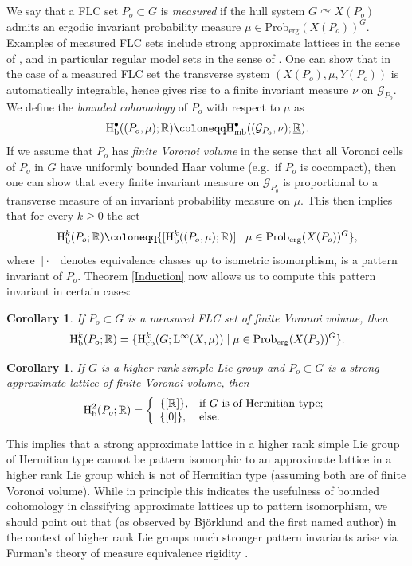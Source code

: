 \documentclass[11pt, oneside]{amsart}
\newtheorem{intro_cor}[intro_thm]{Corollary}
\theoremstyle{definition}
\theoremstyle{remark}
\theoremstyle{TheoremNum}
\newcommand{\Hb}{\textup{H}_{\textup{b}}}
\newcommand{\Hmb}{\textup{H}_{\textup{mb}}}
\newcommand{\Hcb}{\textup{H}_{\textup{cb}}}
\newcommand{\Linf}{\mathrm{L}^{\infty}}
\newcommand{\cG}{\mathcal{G}}
\newcommand{\bR}{\mathbb{R}}
\begin{document}
We say that a FLC set $P_o \subset G$ is \emph{measured} if the hull system $G \curvearrowright X(P_o)$ admits an ergodic invariant probability measure $\mu \in \mathrm{Prob}_{\mathrm{erg}}(X(P_o))^G$. Examples of measured FLC sets include strong approximate lattices in the sense of \cite{BHApproximateLattices}, and in particular regular model sets in the sense of \cite{BHP1}. One can show that in the case of a measured FLC set the transverse system $(X(P_o), \mu, Y(P_o))$ is automatically integrable, hence gives rise to a finite invariant measure $\nu$ on $\cG_{P_o}$. We define the \emph{bounded cohomology} of $P_o$ with respect to $\mu$ as
\[
\Hb^\bullet((P_o, \mu); \bR) \coloneqq \Hmb^\bullet((\cG_{P_o}, \nu); \underline{\bR}).
\]
If we assume that $P_o$ has \emph{finite Voronoi volume} in the sense that all Voronoi cells of $P_o$ in $G$ have uniformly bounded Haar volume (e.g.\ if $P_o$ is cocompact), then one can show that every finite invariant measure on $\cG_{P_o}$ is proportional to a transverse measure of an invariant probability measure on $\mu$. This then implies that for every $k \geq 0$ the set 
\[
\Hb^k(P_o; \bR) \coloneqq \{[\Hb^k((P_o, \mu); \bR)] \mid \mu \in \mathrm{Prob}_{\mathrm{erg}}(X(P_o))^G\},
\]
where $[\cdot]$ denotes equivalence classes up to isometric isomorphism, is a pattern invariant of $P_o$. Theorem \ref{Induction} now allows us to compute this pattern invariant in certain cases:
\begin{intro_cor}\label{ApproxLatt1}
If $P_o \subset G$ is a measured FLC set of finite Voronoi volume, then
\[
\Hb^k(P_o; \bR) = \{\Hcb^k(G; \Linf(X, \mu)) \mid  \mu \in \mathrm{Prob}_{\mathrm{erg}}(X(P_o))^G\}.
\]
\end{intro_cor}
\begin{intro_cor}\label{ApproxLatt2} If $G$ is a higher rank simple Lie group and $P_o \subset G$ is a strong approximate lattice of finite Voronoi volume, then
\[
\Hb^2(P_o; \bR) = \left\{\begin{array}{ll}\{[\bR]\},& \text{if $G$ is of Hermitian type};\\ \{[0]\}, &\text{else.}\end{array} \right.
\]
\end{intro_cor}
This implies that a strong approximate lattice in a higher rank simple Lie group of Hermitian type cannot be pattern isomorphic to an approximate lattice in a higher rank Lie group which is not of Hermitian type (assuming both are of finite Voronoi volume). While in principle this indicates the usefulness of bounded cohomology in classifying approximate lattices up to pattern isomorphism, we should point out that (as observed by Bj\"orklund and the first named author) in the context of higher rank Lie groups much stronger pattern invariants arise via Furman's theory of measure equivalence rigidity \cite{Furman99}.
\end{document}
